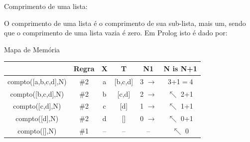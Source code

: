 \documentclass[sans]{beamer}
\begin{document}
\begin{frame}
\begin{block}{Comprimento de uma lista:}

  O comprimento de uma lista é o comprimento de sua sub-lista, mais um,
sendo que o comprimento de uma lista vazia é zero. Em Prolog
isto é dado por:




\end{block}
\end{frame}


\begin{frame}

\begin{block} {Mapa de Memória}

\begin{center}{
\begin{tabular}[c]{c|c|c|c|c|c}
\hline \hline
& \textbf{Regra} & \textbf{X} & \textbf{T} & \textbf{N1} & \textbf{N is N+1}\\ \hline \hline
compto([a,b,c,d],N) & \#2 & a & [b,c,d] & 3 $\rightarrow$ & 3+1$=$4\\ \hline
compto([b,c,d],N) & \#2 & b & [c,d] & 2 $\rightarrow$ & $\nwarrow$ 2+1\\ \hline
compto([c,d],N) & \#2 & c & [d] & 1 $\rightarrow$ & $\nwarrow$ 1+1\\ \hline
compto([d],N) & \#2 & d & [] & 0 $\rightarrow$ & $\nwarrow$ 0+1\\ \hline
compto([],N) & \#1 & -- & -- & -- & $\nwarrow$ 0\\ \hline \hline
\end{tabular}}
\end{center}

\end{block}   
\end{frame}
\end{document}
